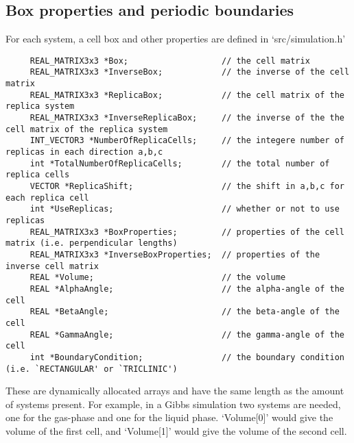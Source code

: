 \subsection*{Box properties and periodic boundaries}

For each system, a cell box and other properties are defined in `src/simulation.h'
\begin{footnotesize}
\begin{verbatim}
     REAL_MATRIX3x3 *Box;                   // the cell matrix
     REAL_MATRIX3x3 *InverseBox;            // the inverse of the cell matrix
     REAL_MATRIX3x3 *ReplicaBox;            // the cell matrix of the replica system
     REAL_MATRIX3x3 *InverseReplicaBox;     // the inverse of the the cell matrix of the replica system
     INT_VECTOR3 *NumberOfReplicaCells;     // the integere number of replicas in each direction a,b,c
     int *TotalNumberOfReplicaCells;        // the total number of replica cells
     VECTOR *ReplicaShift;                  // the shift in a,b,c for each replica cell
     int *UseReplicas;                      // whether or not to use replicas
     REAL_MATRIX3x3 *BoxProperties;         // properties of the cell matrix (i.e. perpendicular lengths)
     REAL_MATRIX3x3 *InverseBoxProperties;  // properties of the inverse cell matrix
     REAL *Volume;                          // the volume
     REAL *AlphaAngle;                      // the alpha-angle of the cell
     REAL *BetaAngle;                       // the beta-angle of the cell
     REAL *GammaAngle;                      // the gamma-angle of the cell
     int *BoundaryCondition;                // the boundary condition (i.e. `RECTANGULAR' or `TRICLINIC')
\end{verbatim}
\end{footnotesize}
These are dynamically allocated arrays and have the same length as the amount of systems present. For example, in a Gibbs simulation two systems are needed, 
one for the gas-phase and one for the liquid phase. `Volume[0]' would give the volume of the first cell, and `Volume[1]' would give the volume of the second cell.

